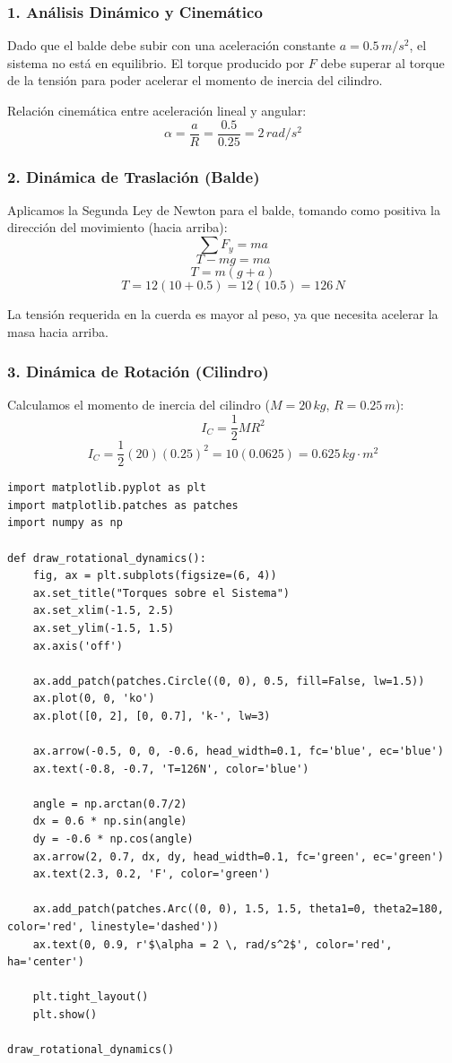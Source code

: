 \documentclass[12pt, a4paper]{article}
\begin{document}
\subsubsection*{1. Análisis Dinámico y Cinemático}
Dado que el balde debe subir con una aceleración constante $a = 0.5 \, \si{m/s^2}$, el sistema no está en equilibrio. El torque producido por $F$ debe superar al torque de la tensión para poder acelerar el momento de inercia del cilindro.

Relación cinemática entre aceleración lineal y angular:
$$\alpha = \frac{a}{R} = \frac{0.5}{0.25} = 2 \, \si{rad/s^2}$$

\subsubsection*{2. Dinámica de Traslación (Balde)}
Aplicamos la Segunda Ley de Newton para el balde, tomando como positiva la dirección del movimiento (hacia arriba):
$$\sum F_y = m a$$
$$T - mg = m a$$
$$T = m(g + a)$$
$$T = 12(10 + 0.5) = 12(10.5) = 126 \, \si{N}$$

La tensión requerida en la cuerda es mayor al peso, ya que necesita acelerar la masa hacia arriba.

\subsubsection*{3. Dinámica de Rotación (Cilindro)}
Calculamos el momento de inercia del cilindro ($M = 20 \, \si{kg}$, $R = 0.25 \, \si{m}$):
$$I_C = \frac{1}{2} M R^2$$
$$I_C = \frac{1}{2} (20) (0.25)^2 = 10 (0.0625) = 0.625 \, \si{kg\cdot m^2}$$

\begin{lstlisting}
import matplotlib.pyplot as plt
import matplotlib.patches as patches
import numpy as np

def draw_rotational_dynamics():
    fig, ax = plt.subplots(figsize=(6, 4))
    ax.set_title("Torques sobre el Sistema")
    ax.set_xlim(-1.5, 2.5)
    ax.set_ylim(-1.5, 1.5)
    ax.axis('off')
    
    ax.add_patch(patches.Circle((0, 0), 0.5, fill=False, lw=1.5))
    ax.plot(0, 0, 'ko')
    ax.plot([0, 2], [0, 0.7], 'k-', lw=3)
    
    ax.arrow(-0.5, 0, 0, -0.6, head_width=0.1, fc='blue', ec='blue')
    ax.text(-0.8, -0.7, 'T=126N', color='blue')
    
    angle = np.arctan(0.7/2)
    dx = 0.6 * np.sin(angle)
    dy = -0.6 * np.cos(angle)
    ax.arrow(2, 0.7, dx, dy, head_width=0.1, fc='green', ec='green')
    ax.text(2.3, 0.2, 'F', color='green')
    
    ax.add_patch(patches.Arc((0, 0), 1.5, 1.5, theta1=0, theta2=180, color='red', linestyle='dashed'))
    ax.text(0, 0.9, r'$\alpha = 2 \, rad/s^2$', color='red', ha='center')

    plt.tight_layout()
    plt.show()

draw_rotational_dynamics()
\end{lstlisting}
\end{document}
